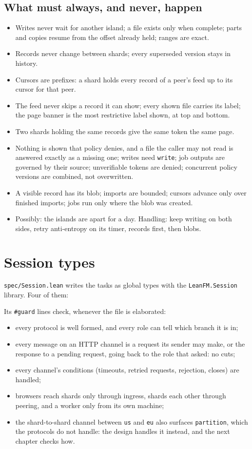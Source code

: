 \documentclass[11pt,oneside]{book}
\providecommand{\tightlist}{\setlength{\itemsep}{0pt}\setlength{\parskip}{0pt}}
\begin{document}
\section{What must always, and never, happen}
\begin{itemize}\tightlist
\item Writes never wait for another island; a file exists only when complete;
  parts and copies resume from the offset already held; ranges are exact.
\item Records never change between shards; every superseded version stays in history.
\item Cursors are prefixes: a shard holds every record of a peer's feed up to its cursor for that peer.
\item The feed never skips a record it can show; every shown file carries its
  label; the page banner is the most restrictive label shown, at top and bottom.
\item Two shards holding the same records give the same token the same page.
\item Nothing is shown that policy denies, and a file the caller may not read is
  answered exactly as a missing one; writes need \texttt{write}; job outputs are
  governed by their source; unverifiable tokens are denied; concurrent policy
  versions are combined, not overwritten.
\item A visible record has its blob; imports are bounded; cursors advance only
  over finished imports; jobs run only where the blob was created.
\item Possibly: the islands are apart for a day. Handling: keep writing on both
  sides, retry anti-entropy on its timer, records first, then blobs.
\end{itemize}

\chapter{Session types}
\texttt{spec/Session.lean} writes the tasks as global types with the
\texttt{LeanFM.Session} library. Four of them:



Its \texttt{\#guard} lines check, whenever the file is elaborated:
\begin{itemize}\tightlist
\item every protocol is well formed, and every role can tell which branch it is in;
\item every message on an HTTP channel is a request its sender may make, or the
  response to a pending request, going back to the role that asked: no cuts;
\item every channel's conditions (timeouts, retried requests, rejection, closes)
  are handled;
\item browsers reach shards only through ingress, shards each other through
  peering, and a worker only from its own machine;
\item the shard-to-shard channel between \texttt{us} and \texttt{eu} also
  surfaces \texttt{partition}, which the protocols do not handle: the design
  handles it instead, and the next chapter checks how.
\end{itemize}
\end{document}
